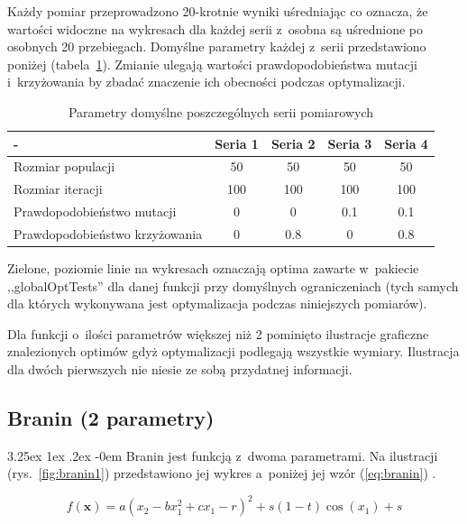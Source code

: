 \documentclass[11pt, a4paper]{article}
\makeatletter
\newcommand{\fbi}{\leavevmode{\parindent=1em\indent}}
\renewcommand\paragraph{\@startsection{paragraph}{5}{\z@}
  {3.25ex \@plus1ex \@minus.2ex}
  {-0em}
  {\normalfont\normalsize\bfseries}}
\makeatother
\begin{document}
\fbi
Każdy pomiar przeprowadzono 20-krotnie wyniki uśredniając co oznacza, że wartości widoczne na wykresach dla każdej serii z~osobna są uśrednione po osobnych 20 przebiegach. Domyślne parametry każdej z~serii przedstawiono poniżej (tabela~\ref{tab:parametry}). Zmianie ulegają wartości  prawdopodobieństwa mutacji i~krzyżowania by zbadać znaczenie ich obecności podczas optymalizacji.

\begin{table}[H]
	\centering
	\caption{Parametry domyślne poszczególnych serii pomiarowych}
	\label{tab:parametry}
	\begin{tabularx}{\textwidth}{|X|c|c|c|c|}
		\hline
		- & Seria 1 & Seria 2 & Seria 3 & Seria 4\\ 
		\hline
		Rozmiar populacji & 50 & 50 & 50 & 50 \\ 
		\hline 
		Rozmiar iteracji & 100 & 100 & 100 & 100 \\ 
		\hline 
		Prawdopodobieństwo mutacji & 0 & 0 & 0.1 & 0.1 \\ 
		\hline 
		Prawdopodobieństwo krzyżowania & 0 & 0.8 & 0 & 0.8 \\ 
		\hline 
	\end{tabularx} 
\end{table}

\fbi
Zielone, poziomie linie na wykresach oznaczają optima zawarte w~pakiecie ,,globalOptTests'' dla danej funkcji przy domyślnych ograniczeniach (tych samych dla których wykonywana jest optymalizacja podczas niniejszych pomiarów).

\fbi
Dla funkcji o~ilości parametrów większej niż 2 pominięto ilustracje graficzne znalezionych optimów gdyż optymalizacji podlegają wszystkie wymiary. Ilustracja dla dwóch pierwszych nie niesie ze sobą przydatnej informacji.

\newpage
\subsection{Branin (2 parametry)}
\paragraph{}
Branin jest funkcją z~dwoma parametrami. Na ilustracji (rys.~\ref{fig:branin1}) przedstawiono jej wykres a~poniżej jej wzór (\ref{eq:branin}) \cite{test4}.

\begin{equation}\label{eq:branin}
	f(\boldsymbol{x}) = a(x_2 - bx_1^2 + cx_1 - r)^2 + s(1 - t)\cos(x_1) + s
\end{equation}
\end{document}
